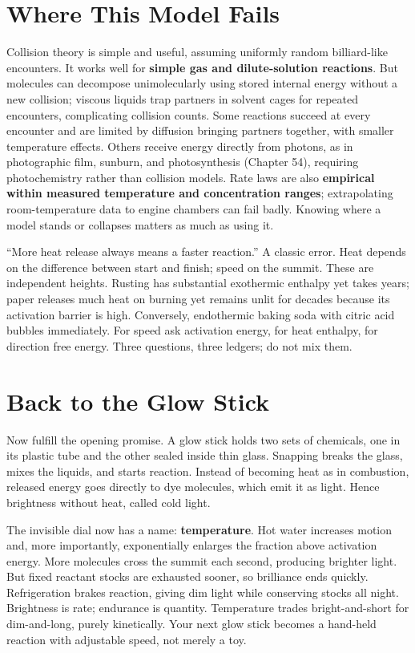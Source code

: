 \section{Where This Model Fails}

Collision theory is simple and useful, assuming uniformly random billiard-like encounters. It works well for \textbf{simple gas and dilute-solution reactions}. But molecules can decompose unimolecularly using stored internal energy without a new collision; viscous liquids trap partners in solvent cages for repeated encounters, complicating collision counts. Some reactions succeed at every encounter and are limited by diffusion bringing partners together, with smaller temperature effects. Others receive energy directly from photons, as in photographic film, sunburn, and photosynthesis (Chapter 54), requiring photochemistry rather than collision models. Rate laws are also \textbf{empirical within measured temperature and concentration ranges}; extrapolating room-temperature data to engine chambers can fail badly. Knowing where a model stands or collapses matters as much as using it.

\begin{wuqu}
``More heat release always means a faster reaction.'' A classic error. Heat depends on the difference between start and finish; speed on the summit. These are independent heights. Rusting has substantial exothermic enthalpy yet takes years; paper releases much heat on burning yet remains unlit for decades because its activation barrier is high. Conversely, endothermic baking soda with citric acid bubbles immediately. For speed ask activation energy, for heat enthalpy, for direction free energy. Three questions, three ledgers; do not mix them.
\end{wuqu}

\section{Back to the Glow Stick}

Now fulfill the opening promise. A glow stick holds two sets of chemicals, one in its plastic tube and the other sealed inside thin glass. Snapping breaks the glass, mixes the liquids, and starts reaction. Instead of becoming heat as in combustion, released energy goes directly to dye molecules, which emit it as light. Hence brightness without heat, called cold light.

The invisible dial now has a name: \textbf{temperature}. Hot water increases motion and, more importantly, exponentially enlarges the fraction above activation energy. More molecules cross the summit each second, producing brighter light. But fixed reactant stocks are exhausted sooner, so brilliance ends quickly. Refrigeration brakes reaction, giving dim light while conserving stocks all night. Brightness is rate; endurance is quantity. Temperature trades bright-and-short for dim-and-long, purely kinetically. Your next glow stick becomes a hand-held reaction with adjustable speed, not merely a toy.

